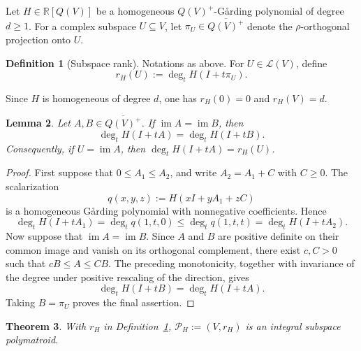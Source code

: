 \documentclass[oneside,english,letterpaper]{amsart}
\numberwithin{equation}{section}
\theoremstyle{plain}
\newtheorem{thm}{Theorem}[section]
\newtheorem{lem}[thm]{Lemma}
\theoremstyle{definition}
\newtheorem{defn}[thm]{Definition}
\theoremstyle{remark}
\begin{document}
Let $H\in\mathbb R[Q(V)]$ be a homogeneous $Q(V)^+$-G{\aa}rding
polynomial of degree $d\geq1$. For a complex subspace \(U\subseteq V\),
let \(\pi_U\in\overline{Q(V)^+}\) denote the
\(\rho\)-orthogonal projection onto \(U\).
\begin{defn}[Subspace rank]
\label{def:subspace-rank}Notations as above.
For \(U\in\mathcal L(V)\), define
\begin{equation}
r_H(U):=\deg_t H(I+t\pi_U).
\label{eq:subspace-rank}
\end{equation}
\end{defn}
Since \(H\) is homogeneous of degree \(d\), one has
\(r_H(0)=0\) and \(r_H(V)=d\).
\begin{lem}
\label{lem:directional-degree-image}
Let \(A,B\in\overline{Q(V)^+}\). If
\(\operatorname{im}A=\operatorname{im}B\), then
\[
\deg_t H(I+tA)=\deg_t H(I+tB).
\]
Consequently, if \(U=\operatorname{im}A\), then
\(\deg_t H(I+tA)=r_H(U)\).
\end{lem}
\begin{proof}
First suppose that \(0\leq A_1\leq A_2\), and write
\(A_2=A_1+C\) with \(C\geq 0\). The scalarization
\[
q(x,y,z):=H(xI+yA_1+zC)
\]
is a homogeneous G{\aa}rding polynomial with nonnegative
coefficients. Hence
\[
\deg_t H(I+tA_1)
=
\deg_t q(1,t,0)
\leq
\deg_t q(1,t,t)
=
\deg_t H(I+tA_2).
\]
Now suppose that \(\operatorname{im}A=\operatorname{im}B\).
Since \(A\) and \(B\) are positive definite on their common image
and vanish on its orthogonal complement, there exist \(c,C>0\) such
that \(cB\leq A\leq CB\). The preceding monotonicity, together with
invariance of the degree under positive rescaling of the direction,
gives
\[
\deg_t H(I+tB)=\deg_t H(I+tA).
\]
Taking \(B=\pi_U\) proves the final assertion.
\end{proof}
\begin{thm}
\label{thm:subspace-rank-submodular}
With $r_H$ in Definition~\ref{def:subspace-rank},
\(\mathcal P_H:=(V,r_H)\) is an integral subspace polymatroid.
\end{thm}
\end{document}

